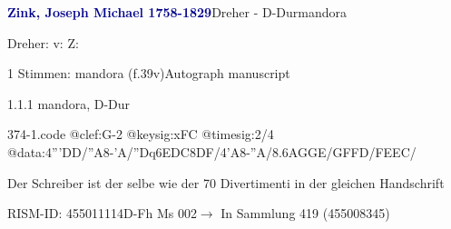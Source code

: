 \documentclass[twocolumn]{book}
\begin{document}
\par \vspace{7pt} \textcolor{darkblue}{\textbf{Zink, Joseph Michael  1758-1829}}\hfillplus{\textbf{[374]}}\newline Dreher - D-Dur\newline mandora
\par \begin{itshape}[f.39v, at left:] Dreher: v: Z:\end{itshape} 
\par \textcolor{darkblue}{}  1 Stimmen: mandora  (f.39v)\newline Autograph manuscript
\par 1.1.1  mandora, D-Dur  
\begin{filecontents*}{374-1.code}
@clef:G-2
@keysig:xFC
@timesig:2/4
@data:4'''DD/''A8-'A/{''Dq6EDC}{8DF}/4'A8-''A/{8.6AGGE}/{GFFD}/{FEEC}/
\end{filecontents*}
\newline
%
\par Der Schreiber ist der selbe wie der 70 Divertimenti in der gleichen Handschrift
\par RISM-ID: 455011114\newline D-Fh  Ms 002\newline $\rightarrow$ In Sammlung 419 (455008345)
      
\end{document}
